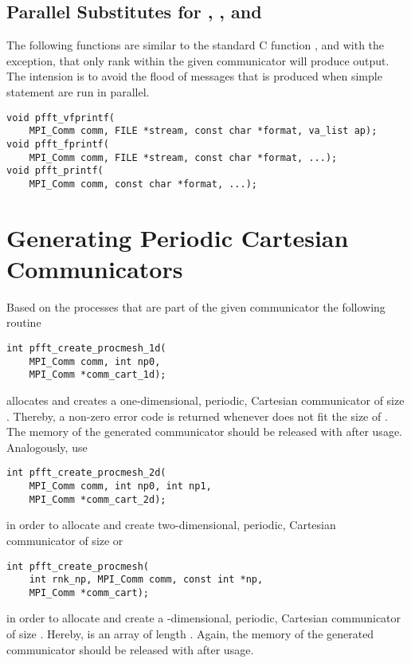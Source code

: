 \subsection{Parallel Substitutes for , , and }\label{sec:fprintf}
The following functions are similar to the standard C function ,  and  with the exception,
that only rank  within the given communicator  will produce output.
The intension is to avoid the flood of messages that is produced when simple  statement are run in parallel.
\begin{lstlisting}
void pfft_vfprintf(
    MPI_Comm comm, FILE *stream, const char *format, va_list ap);
void pfft_fprintf(
    MPI_Comm comm, FILE *stream, const char *format, ...);
void pfft_printf(
    MPI_Comm comm, const char *format, ...);
\end{lstlisting}

\section{Generating Periodic Cartesian Communicators}\label{sec:create-comm}

Based on the processes that are part of the given communicator  the following routine
\begin{lstlisting}
int pfft_create_procmesh_1d(
    MPI_Comm comm, int np0,
    MPI_Comm *comm_cart_1d);
\end{lstlisting}
allocates and creates a one-dimensional, periodic, Cartesian communicator  of size .
Thereby, a non-zero error code is returned whenever  does not fit the size of .
The memory of the generated communicator should be released with  after usage.
Analogously, use 
\begin{lstlisting}
int pfft_create_procmesh_2d(
    MPI_Comm comm, int np0, int np1,
    MPI_Comm *comm_cart_2d);
\end{lstlisting}
in order to allocate and create two-dimensional, periodic, Cartesian communicator  of size  or
\begin{lstlisting}
int pfft_create_procmesh(
    int rnk_np, MPI_Comm comm, const int *np,
    MPI_Comm *comm_cart);
\end{lstlisting}
in order to allocate and create a -dimensional, periodic, Cartesian communicator of size .
Hereby,  is an array of length .
Again, the memory of the generated communicator should be released with  after usage.
